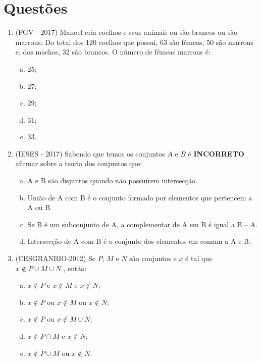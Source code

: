 \section{Questões}

 \begin{enumerate}
  \item (FGV - 2017) Manoel cria coelhos e seus animais ou são brancos ou são marrons. Do total dos 120 coelhos que possui, 63 são fêmeas, 50 são marrons e, dos machos, 32 são brancos. O número de fêmeas marrons é:
  \begin{multicols}{5}
  \begin{enumerate}[a)]
  \item 25;
  \item 27;
  \item 29;
  \item 31;
  \item 33.
  \end{enumerate}
  \end{multicols}

  \item (IESES - 2017)  Sabendo que temos os conjuntos $A$ e $B$ é \textbf{INCORRETO} afirmar sobre a teoria dos conjuntos que:
  \begin{enumerate}[a)]
  \item A e B são disjuntos quando não possuírem intersecção.
  \item União de A com B é o conjunto formado por elementos que pertencem a A ou B.
  \item Se B é um subconjunto de A, a complementar de A em B é igual a B – A.
  \item Intersecção de A com B é o conjunto dos elementos em comum a A e B.
  \end{enumerate}

  \item (CESGRANRIO-2012) Se $P$, $M$ e $N$ são conjuntos e $x$ é tal que $x \notin P \cup M \cup N$ , então:
  \begin{enumerate}[a)]
  \item $x \notin P$  e $x  \notin M$  e $x \notin N$;
  \item $x \notin P$ ou $x \notin M$ ou $x \notin N$;
  \item $x \notin P$ ou $x \notin M \cup N$;
  \item $x \notin P \cap M$ e $x \notin N$;
  \item $x \notin P \cup M$ ou $x \notin N$.
  \end{enumerate}


\end{enumerate}
